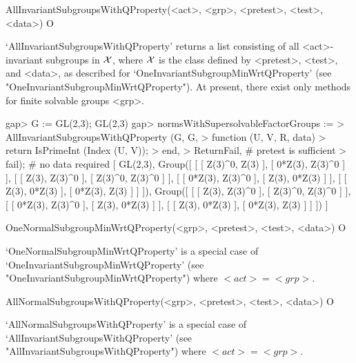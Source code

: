 \>AllInvariantSubgroupsWithQProperty(<act>, <grp>, <pretest>, <test>, <data>) O

`AllInvariantSubgroupsWithQProperty' returns a list consisting of all 
<act>-invariant subgroups in $\cal X$, where $\cal X$ is the class defined by <pretest>,
<test>, and <data>, as described for `OneInvariantSubgroupMinWrtQProperty' (see
"OneInvariantSubgroupMinWrtQProperty"). 
At present, there exist only methods for finite solvable groups <grp>.

\beginexample
gap> G := GL(2,3);
GL(2,3)
gap> normsWithSupersolvableFactorGroups :=
> AllInvariantSubgroupsWithQProperty (G, G, 
>    function (U, V, R, data)
>       return IsPrimeInt (Index (U, V));
>    end,
>    ReturnFail, # pretest is sufficient
>    fail); # no data required
[ GL(2,3), 
  Group([ [ [ Z(3)^0, Z(3) ], [ 0*Z(3), Z(3)^0 ] ],
      [ [ Z(3), Z(3)^0 ], [ Z(3)^0, Z(3)^0 ] ], 
      [ [ 0*Z(3), Z(3)^0 ], [ Z(3), 0*Z(3) ] ], 
      [ [ Z(3), 0*Z(3) ], [ 0*Z(3), Z(3) ] ] ]), 
  Group([ [ [ Z(3), Z(3)^0 ], [ Z(3)^0, Z(3)^0 ] ], 
      [ [ 0*Z(3), Z(3)^0 ], [ Z(3), 0*Z(3) ] ], 
      [ [ Z(3), 0*Z(3) ], [ 0*Z(3), Z(3) ] ] ]) ]
\endexample


\>OneNormalSubgroupMinWrtQProperty(<grp>, <pretest>, <test>, <data>) O

`OneNormalSubgroupMinWrtQProperty' is a special case of 
`OneInvariantSubgroupMinWrtQProperty' (see
"OneInvariantSubgroupMinWrtQProperty") where $<act> = <grp>$. 

\>AllNormalSubgroupsWithQProperty(<grp>, <pretest>, <test>, <data>) O

`AllNormalSubgroupsWithQProperty' is a special case of 
`AllInvariantSubgroupsWithQProperty' (see
"AllInvariantSubgroupsWithQProperty") where $<act> = <grp>$. 


